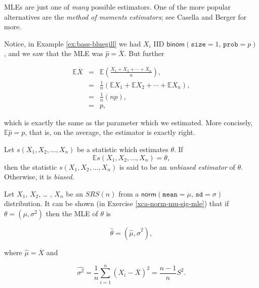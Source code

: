 \documentclass[]{book}
\numberwithin{equation}{chapter}
\numberwithin{figure}{chapter}
\theoremstyle{plain}
\theoremstyle{definition}
\theoremstyle{remark}
\theoremstyle{definition}
\theoremstyle{definition}
\theoremstyle{remark}
\let\BeginKnitrBlock\begin \let\EndKnitrBlock\end
\begin{document}
MLEs are just one of \emph{many} possible estimators. One of the more
popular alternatives are the \emph{method of moments estimators}; see
Casella and Berger \autocite{Casella2002} for more.

Notice, in Example \ref{ex:bass-bluegill} we had \(X_{i}\) IID
\(\mathsf{binom}(\mathtt{size}=1,\,\mathtt{prob}=p)\), and we saw that
the MLE was \(\hat{p}=\overline{X}\). But further

\begin{eqnarray*}
\mathbb{E}\overline{X} & = & \mathbb{E}\left(\frac{X_{1}+X_{2}+\cdots+X_{n}}{n}\right),\\
 & = & \frac{1}{n}\left(\mathbb{E} X_{1}+\mathbb{E} X_{2}+\cdots+\mathbb{E} X_{n}\right),\\
 & = & \frac{1}{n}\left(np\right),\\
 & = & p,
\end{eqnarray*}

which is exactly the same as the parameter which we estimated. More
concisely, \(\mathbb{E}\hat{p}=p\), that is, on the average, the
estimator is exactly right.

\bigskip

\BeginKnitrBlock{definition}
\protect\hypertarget{def:unnamed-chunk-382}{}{\label{def:unnamed-chunk-382}}Let
\(s(X_{1},X_{2},\ldots,X_{n})\) be a statistic which estimates
\(\theta\). If \[ \mathbb{E} s(X_{1},X_{2},\ldots,X_{n})=\theta, \] then
the statistic \(s(X_{1},X_{2},\ldots,X_{n})\) is said to be an
\emph{unbiased estimator} of \(\theta\). Otherwise, it is \emph{biased}.
\EndKnitrBlock{definition}

\bigskip

\BeginKnitrBlock{example}
\protect\hypertarget{ex:normal-mle-both}{}{\label{ex:normal-mle-both}}Let
\(X_{1}\), \(X_{2}\), \ldots{} , \(X_{n}\) be an \(SRS(n)\) from a
\(\mathsf{norm}(\mathtt{mean}=\mu,\,\mathtt{sd}=\sigma)\) distribution.
It can be shown (in Exercise \ref{xca-norm-mu-sig-mle}) that if
\(\mbox{$\theta$}=(\mu,\sigma^{2})\) then the MLE of \(\theta\) is

\begin{equation}
\hat{\theta}=(\hat{\mu},\hat{\sigma}^{2}),
\end{equation}

where \(\hat{\mu}=\overline{X}\) and

\begin{equation}
\hat{\sigma^{2}}=\frac{1}{n}\sum_{i=1}^{n}\left(X_{i}-\overline{X}\right)^{2}=\frac{n-1}{n}S^{2}.
\end{equation}
\EndKnitrBlock{example}
\end{document}
